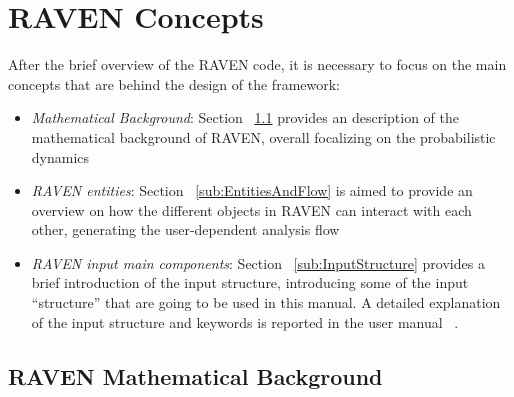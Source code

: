 \section{RAVEN Concepts}
\label{sec:RAVENconcept}
After the brief overview of the RAVEN code, it is necessary to focus on the main concepts that are behind the design of the framework:
\begin{itemize}
    \item \textit{Mathematical Background}: Section ~\ref{sub:mathBackground} provides an description of the mathematical background of RAVEN,
     overall focalizing on the probabilistic dynamics
    \item \textit{RAVEN entities}: Section ~\ref{sub:EntitiesAndFlow} is aimed to provide an overview on how the different objects in
    RAVEN can interact with each other, generating the user-dependent analysis flow
    \item \textit{RAVEN input main components}: Section ~\ref{sub:InputStructure} provides a brief introduction of the input structure, introducing
    some of the input ``structure'' that are going to be used in this manual. A detailed explanation of the
    input structure and keywords is reported in the user manual ~\cite{RAVENuserManual}.
\end{itemize}
\subsection{RAVEN Mathematical Background}
\label{sub:mathBackground}
